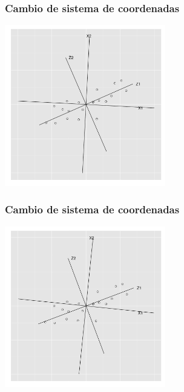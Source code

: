 \documentclass{beamer}
\begin{document}
\begin{frame}\frametitle{Cambio de sistema de coordenadas}
  \begin{overlayarea}{\textwidth}{8cm} 
 \begin{center}
   \includegraphics[height=7cm]{x1x2z1z2rotated02.png}
 \end{center}
   \end{overlayarea}
 \end{frame}
\begin{frame}\frametitle{Cambio de sistema de coordenadas}
   \begin{overlayarea}{\textwidth}{8cm} 
 \begin{center}
   \includegraphics[height=7cm]{x1x2z1z2rotated03.png}
 \end{center}
   \end{overlayarea}
 \end{frame}
\end{document}
